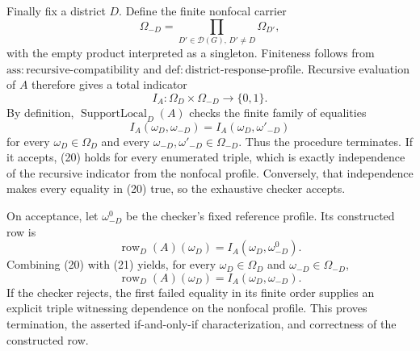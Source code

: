 Finally fix a district \(D\).  Define the finite nonfocal carrier
\[
 \Omega_{-D}=\prod_{D'\in\mathcal D(G),\,D'\ne D}\Omega_{D'},
\]
with the empty product interpreted as a singleton.  Finiteness follows from \(\mathrm{ass:recursive\text{-}compatibility}\) and \(\mathrm{def:district\text{-}response\text{-}profile}\).  Recursive evaluation of \(A\) therefore gives a total indicator
\[
 I_A:\Omega_D\times\Omega_{-D}\longrightarrow\{0,1\}.
\tag{19}
\]
By definition, \(\operatorname{SupportLocal}_D(A)\) checks the finite family of equalities
\[
 I_A(\omega_D,\omega_{-D})
 =I_A(\omega_D,\omega'_{-D})
\tag{20}
\]
for every \(\omega_D\in\Omega_D\) and every \(\omega_{-D},\omega'_{-D}\in\Omega_{-D}\).  Thus the procedure terminates.  If it accepts, (20) holds for every enumerated triple, which is exactly independence of the recursive indicator from the nonfocal profile.  Conversely, that independence makes every equality in (20) true, so the exhaustive checker accepts.

On acceptance, let \(\omega_{-D}^0\) be the checker's fixed reference profile.  Its constructed row is
\[
 \operatorname{row}_D(A)(\omega_D)
 =I_A(\omega_D,\omega_{-D}^0).
\tag{21}
\]
Combining (20) with (21) yields, for every \(\omega_D\in\Omega_D\) and \(\omega_{-D}\in\Omega_{-D}\),
\[
 \operatorname{row}_D(A)(\omega_D)
 =I_A(\omega_D,\omega_{-D}).
\]
If the checker rejects, the first failed equality in its finite order supplies an explicit triple witnessing dependence on the nonfocal profile.  This proves termination, the asserted if-and-only-if characterization, and correctness of the constructed row.
